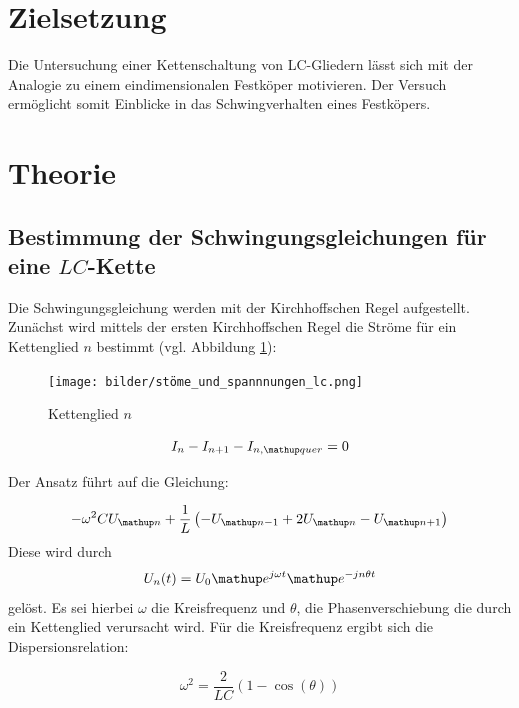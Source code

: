 \setcounter{page}{1}
\section*{Zielsetzung}
Die Untersuchung einer Kettenschaltung von LC-Gliedern lässt sich mit der Analogie  
zu einem eindimensionalen Festköper motivieren.
Der Versuch ermöglicht somit Einblicke in das Schwingverhalten eines 
Festköpers.

\section{Theorie}

\subsection{Bestimmung der Schwingungsgleichungen für eine $LC$-Kette}
Die Schwingungsgleichung werden mit der Kirchhoffschen Regel aufgestellt.
Zunächst wird mittels der ersten Kirchhoffschen Regel die Ströme für ein Kettenglied $n$ 
bestimmt (vgl. Abbildung \ref{fig:kettenglied}):

\begin{figure}
  \centering
  \texttt{[image: bilder/stöme\_und\_spannnungen\_lc.png]}
  \caption{Kettenglied $n$}
  \label{fig:kettenglied}
\end{figure}

\begin{equation}
\label{eq:kircheins_lc}
I_n-I_{n+1}-I_{n,\map{quer}}=0
\end{equation}

Der Ansatz führt auf die Gleichung:

\begin{equation}
\label{eq:gleichung_lc}
-\omega^2CU\ua{n}+\frac{1}{L}\left(-U\ua{n-1}+2U\ua{n}-U\ua{n+1}\right)
\end{equation}
Diese wird durch 
\begin{equation}
\label{eq:loesung_gleichung_lc}
U_n(t)=U_0 \map{e}^{j\omega t} \map{e}^{-jn\theta t}
\end{equation}
gelöst.
Es sei hierbei $\omega$ die Kreisfrequenz und $\theta$, die Phasenverschiebung 
die durch ein Kettenglied verursacht wird.
Für die Kreisfrequenz ergibt sich die Dispersionsrelation:

\begin{equation}
\label{eq:kreisfrequenz_lc_glied}
\omega^2=\frac{2}{LC}\left(1-\cos(\theta)\right)
\end{equation}

